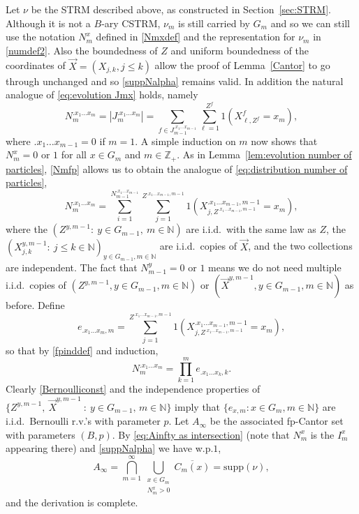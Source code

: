 \documentclass[12pt]{article}
\makeatletter
\renewenvironment{proof}[1][\proofname]{%
\par\pushQED{\qed}\normalfont%
\topsep6\p@\@plus6\p@\relax
\trivlist\item[\hskip\labelsep\bfseries#1\@addpunct{.}]%
\ignorespaces
}{%
\popQED\endtrivlist\@endpefalse
}
\numberwithin{theorem}{section}
\theoremstyle{def}
\numberwithin{equation}{section}
\newcommand{\Z}{\mathbb{Z}}
\newcommand{\N}{\mathbb{N}}
\newcommand{\supp}{\mathrm{supp}}
\makeatother
\begin{document}
{\begin{proof}
Let $\nu$ be the STRM described above, as constructed in Section~\ref{sec:STRM}. Although it is not a $B$-ary CSTRM, $\nu_m$ is still carried by $G_m$ and so we can still use the notation $N^x_m$ defined in \eqref{Nmxdef} and the representation for $\nu_m$ in \eqref{numdef2}.  
Also the boundedness of $Z$ and uniform boundedness of the coordinates of $\vec X=(X_{j,k}, j\le k)$ allow the proof of Lemma~\ref{Cantor} to go through unchanged and so \eqref{suppNalpha} remains valid.
In addition the natural analogue of \eqref{eq:evolution Jmx} holds, namely
\begin{equation}\label{Nmfp}
N^{.x_1\dots x_m}_m=|J^{.x_1\dots x_m}_m|=\sum_{f\in J_{m-1}^{.x_1\dots x_{m-1}}}\sum_{\ell=1}^{Z^f}1(X_{\ell,Z^f}^f=x_m),
\end{equation}
where $.x_1\dots x_{m-1}=0$ if $m=1$. 
A simple induction on $m$ now shows that $N_m^x=0\text{ or }1$ for all $x\in G_m$ and $m\in\Z_+$. As in Lemma~\ref{lem:evolution number of particles}, \eqref{Nmfp} allows us to obtain the analogue of \eqref{eq:distribution number of particles},
\begin{equation}\label{fpinddef}N^{.x_1\dots x_m}_m=\sum_{i=1}^{N_{m-1}^{.x_1\dots x_{m-1}}}\sum_{j=1}^{Z^{.x_1\dots x_{m-1},m-1}} 1(X_{j,Z^{.x_1\dots x_{m-1},m-1}}^{.x_1\dots x_{m-1},m-1}= x_m),
\end{equation} 
where the $(Z^{y,m-1} : \ y\in G_{m-1},\ m\in\N)$ are i.i.d.\ with the same law as $Z$, the $(X_{j,k}^{y,m-1} :\ j\le k\in\N)_{y\in G_{m-1},m\in\N}$ are i.i.d.\ copies of $\vec{X}$, and the two collections are independent. The fact that $N^y_{m-1}=0\text{ or }1$ means we do not need multiple i.i.d.\ copies of  $(Z^{y,m-1},y\in G_{m-1}, m\in\N)$ or $(\vec{X}^{y,m-1},y\in G_{m-1}, m\in\N)$ as before. Define 
\[e_{.x_1\dots x_m,m}=\sum_{j=1}^{Z^{.x_1\dots x_{m-1},m-1}} 1(X_{j,Z^{.x_1\dots x_{m-1},m-1}}^{.x_1\dots x_{m-1},m-1}= x_m),\]
so that by \eqref{fpinddef} and induction,
\[N^{.x_1\dots x_m}_m=\prod_{k=1}^me_{.x_1\dots x_k,k}.\]
Clearly \eqref{Bernoulliconst} and the independence properties of $\{Z^{y,m-1}, \ \vec{X}^{y,m-1} \ : \  y\in G_{m-1},\,m\in\N\}$ imply that $\{e_{x,m}:x\in G_m,m\in\N\}$ are i.i.d.\ Bernoulli r.v.'s with parameter $p$.  
Let $A_\infty$ be the associated fp-Cantor set with parameters $(B,p)$.  
By \eqref{eq:Ainfty as intersection} (note that $N^x_m$ is the $I^x_m$ appearing there) and \eqref{suppNalpha} we have w.p.$1$,
\[A_\infty=\bigcap_{m=1}^\infty\bigcup_{\substack{x\in G_m \\ N_m^x>0}}\overline{C_m(x)}=\supp(\nu),\]
and the derivation is complete.
\end{proof}}
\end{document}
